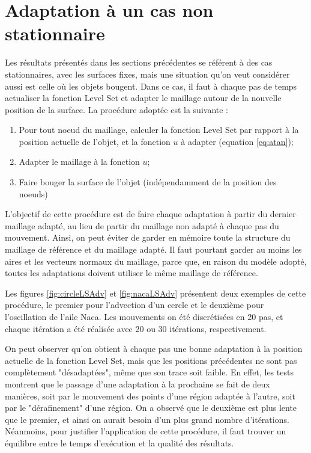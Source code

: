 
\section{Adaptation à un cas non stationnaire}
\label{sec:nonstat}

\indent Les résultats présentés dans les sections précédentes se référent à des cas stationnaires, avec les surfaces fixes, mais une situation qu'on veut considérer aussi  est celle où les objets bougent. Dans ce cas, il faut à chaque pas de temps actualiser la fonction Level Set et adapter le maillage autour de la nouvelle position de la surface. La procédure adoptée est la suivante : 

\begin{enumerate}
	\item Pour tout noeud du maillage, calculer la fonction Level Set par rapport à la position actuelle de l'objet, et la fonction \(u\) à adapter (equation \eqref{eq:atan});
	\item Adapter le maillage à la fonction \(u\);
	\item Faire bouger la surface de l'objet (indépendamment de la position des noeuds)
\end{enumerate}

\indent L'objectif de cette procédure est de faire chaque adaptation à partir du dernier maillage adapté, au lieu de partir du maillage non adapté à chaque pas du mouvement. Ainsi, on peut éviter de garder en mémoire toute la structure du maillage de référence et du maillage adapté. Il faut pourtant garder au moins les aires et les vecteurs normaux du maillage, parce que, en raison du modèle adopté, toutes les adaptations doivent utiliser le même maillage de référence.

\indent Les figures \ref{fig:circleLSAdv} et \ref{fig:nacaLSAdv} présentent deux exemples de cette procédure, le premier pour l'advection d'un cercle et le deuxième pour l'oscillation de l'aile Naca. Les mouvements on été discrétisées en 20 pas, et chaque itération a été réalisée avec 20 ou 30 itérations, respectivement.

\indent On peut observer qu'on obtient à chaque pas une bonne adaptation à la position actuelle de la fonction Level Set, mais que les positions précédentes ne sont pas complètement "désadaptées", même que son trace soit faible. En effet, les tests montrent que le passage d'une adaptation à la prochaine se fait de deux manières, soit par le mouvement des points d'une région adaptée à l'autre, soit par le "dérafinement" d'une région. On a observé que le deuxième est plus lente que le premier, et ainsi on aurait besoin d'un plus grand nombre d'itérations. Néanmoins, pour justifier l'application de cette procédure, il faut trouver un équilibre entre le temps d'exécution et la qualité des résultats.

